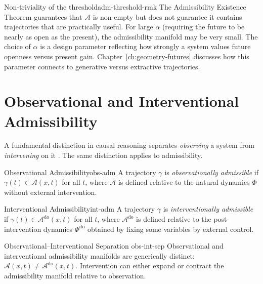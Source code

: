 \documentclass[12pt,twoside,openright]{book}
\newcommand{\adm}{\mathcal{A}}
\begin{document}
\begin{remark}{Non-triviality of the threshold}{adm-threshold-rmk}
  The Admissibility Existence Theorem guarantees that
  $\adm$ is non-empty but does not guarantee it contains
  trajectories that are practically useful. For large
  $\alpha$ (requiring the future to be nearly as open as
  the present), the admissibility manifold may be very
  small. The choice of $\alpha$ is a design parameter
  reflecting how strongly a system values future openness
  versus present gain. Chapter~\ref{ch:geometry-futures}
  discusses how this parameter connects to generative
  versus extractive trajectories.
\end{remark}

\section{Observational and Interventional Admissibility}
\label{sec:ch14-obs-int}

A fundamental distinction in causal reasoning separates
\emph{observing} a system from \emph{intervening} on it
\parencite{pearl2000causality}. The same distinction
applies to admissibility.

\begin{definition}{Observational Admissibility}{obs-adm}
  A trajectory $\gamma$ is \emph{observationally admissible}
  if $\gamma(t)\in\adm(x,t)$ for all $t$, where $\adm$ is
  defined relative to the natural dynamics $\Phi$ without
  external intervention.
\end{definition}

\begin{definition}{Interventional Admissibility}{int-adm}
  A trajectory $\gamma$ is \emph{interventionally
  admissible} if $\gamma(t)\in\adm^\mathrm{do}(x,t)$ for
  all $t$, where $\adm^\mathrm{do}$ is defined relative to
  the post-intervention dynamics $\Phi^\mathrm{do}$ obtained
  by fixing some variables by external control.
\end{definition}

\begin{theorem}{Observational--Interventional Separation}%
  {obs-int-sep}
  Observational and interventional admissibility manifolds
  are generically distinct: $\adm(x,t) \ne \adm^\mathrm{do}(x,t)$.
  Intervention can either expand or contract the
  admissibility manifold relative to observation.
\end{theorem}
\end{document}
